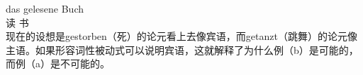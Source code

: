 \ex
\gll das gelesene Buch\\
      读 书\\
\zl
现在的设想是gestorben（死）的论元看上去像宾语，而getanzt（跳舞）的论元像主语。如果形容词性被动式可以说明宾语，这就解释了为什么例（b）是可能的，而例（a）是不可能的。

